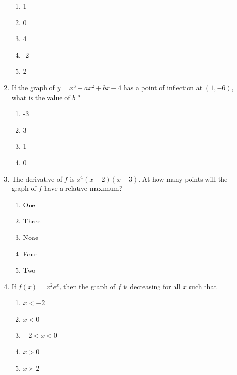 \documentclass{article}
\begin{document}
\begin{enumerate}
\begin{minipage}[t]{\linewidth}
\vspace{1em}
		\begin{enumerate}
		\itemsep1em
			\item 1
			\item 0
			\item 4
			\item -2
			\item 2
		\end{enumerate}
	\end{minipage}
	\item
	\begin{minipage}[t]{\linewidth}
		If the graph of \(y=x^{3}+a x^{2}+b x-4\) has a point of inflection at
\((1,-6)\), what is the value of \(b\) ?
\vspace{1em}
		\begin{enumerate}
		\itemsep1em
			\item -3
			\item 3
			\item 1
			\item 0
		\end{enumerate}
	\end{minipage}
	\item
	\begin{minipage}[t]{\linewidth}
		The derivative of \(f\) is \(x^{4}(x-2)(x+3)\). At how many points will
the graph of \(f\) have a relative maximum?
\vspace{1em}
		\begin{enumerate}
		\itemsep1em
			\item One
			\item Three
			\item None
			\item Four
			\item Two
		\end{enumerate}
	\end{minipage}
	\item
	\begin{minipage}[t]{\linewidth}
		If \(f(x)=x^{2} e^{x}\), then the graph of \(f\) is decreasing for all
\(x\) such that
\vspace{1em}
		\begin{enumerate}
		\itemsep1em
			\item \(x<-2\)
			\item \(x<0\)
			\item \(-2<x<0\)
			\item \(x>0\)
			\item \(x \succ 2\)
		\end{enumerate}

\end{minipage}
\end{enumerate}
\end{document}
